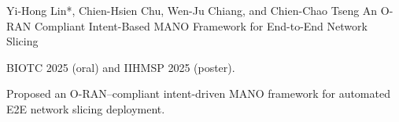 

\begin{cventries}
  
  \cventrypub
  {Yi-Hong Lin*, Chien-Hsien Chu, Wen-Ju Chiang, and Chien-Chao Tseng} %
  {An O-RAN Compliant Intent-Based MANO Framework for End-to-End Network Slicing} %
  {} %
  {} %
  {
    \begin{cvitems} %
      \item {BIOTC 2025 (oral) and IIHMSP 2025 (poster).}
      \item {Proposed an O-RAN–compliant intent-driven MANO framework for automated E2E network slicing deployment.}
    \end{cvitems}
  }

  \end{cventries}